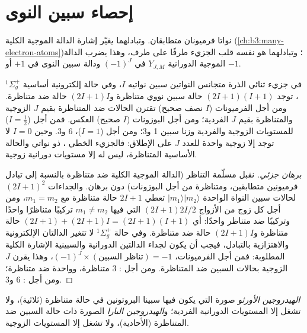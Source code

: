 \section{إحصاء سبين النوى}

نواتا  فرميونان متطابقان. وتبادلهما يغيّر إشارة
الدالة الموجية الكلية (\cref{ch:b3:many-electron-atoms})؛ وتبادلهما هو
نفسه قلب الجزيء طرفًا على طرف، وهذا يضرب الدالة الموجية الدورانية
$Y_{J,M}$ في $(-1)^J$ ودالة سبين النوى في $+1$ أو $-1$.

\begin{theorem}\label{thm:b3:statistical-thermo-applied:spin-statistics}
في جزيء ثنائي الذرة متجانس النواتين سبين نواتيه $I$، وفي حالة
إلكترونية أساسية ${}^1\Sigma_g^+$، توجد $(2I+1)(I+1)$ حالة سبين نووي متناظرة و$(2I+1)I$
حالة ضد متناظرة. ومن أجل الفرميونات ($I$ نصف صحيح)
تقترن الحالات ضد المتناظرة بقيم $J$ الزوجية والمتناظرة بقيم $J$ الفردية؛ ومن أجل
البوزونات ($I$ صحيح) العكس. فمن أجل  ($I = \frac12$) للمستويات الزوجية والفردية
وزنا سبين 1 و3؛ ومن أجل  ($I = 1$)، 6 و3. وحين $I = 0$ لا توجد إلا زوجية واحدة
للعدد $J$ على الإطلاق: فالجزيء الخطي ، ذو نواتي  
والحالة الأساسية المتناظرة، ليس له إلا مستويات دورانية زوجية.
\end{theorem}

\begin{proof}[برهان جزئي]
نقبل مسلّمة التناظر (الدالة الموجية الكلية ضد متناظرة بالنسبة إلى
تبادل فرميونين متطابقين، ومتناظرة من أجل البوزونات) دون برهان. 
والجداءات $(2I+1)^2$ لحالات سبين النواة الواحدة $|m_1\rangle|m_2\rangle$ تعطي $2I+1$ حالة متناظرة
مع $m_1 = m_2$، ومن أجل كل زوج من الأزواج $(2I+1)2I/2$ التي فيها $m_1 \ne m_2$ تركيبًا
متناظرًا واحدًا وتركيبًا ضد متناظر واحدًا: أي $(2I+1) + (2I+1)I = (2I+1)(I+1)$
حالة متناظرة و$(2I+1)I$ حالة ضد متناظرة. وفي حالة ${}^1\Sigma_g^+$ لا تتغير الدالتان الإلكترونية
والاهتزازية بالتبادل، فيجب أن يكون لجداء الدالتين
الدورانية والسبينية الإشارة الكلية المطلوبة: فمن أجل
الفرميونات، $(-1)^J \times(\text{تناظر السبين}) = -1$، وهذا يقرن $J$ الزوجية
بحالات السبين ضد المتناظرة. ومن أجل : 3 متناظرة، وواحدة ضد متناظرة؛ ومن أجل : 6 
و3.
\end{proof}

\begin{definition}\label{def:b3:statistical-thermo-applied:spin-isomers}
\emph{الهيدروجين الأورثو} صورة  التي يكون فيها
سبينا البروتونين في حالة متناظرة (ثلاثية)، ولا تشغل إلا المستويات
الدورانية الفردية؛ و\emph{الهيدروجين البارا} الصورة ذات
حالة السبين ضد المتناظرة (الأحادية)، ولا تشغل إلا المستويات الزوجية.
\end{definition}

